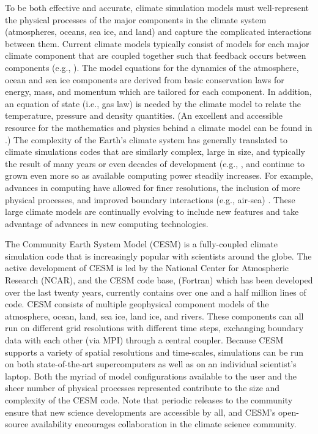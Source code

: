 To be both effective and accurate, climate simulation models must well-represent the physical processes of the major components in the climate system (atmospheres, oceans, sea ice, and land) and capture the complicated interactions between them.  Current climate models typically consist of models for each major climate component that are coupled together such that feedback occurs between components (e.g., \cite{washington2005}).  The model equations for the dynamics of the atmosphere, ocean and sea ice components are derived from basic conservation laws for energy, mass, and momentum which are tailored for each component.  In addition, an equation of state (i.e., gas law) is needed by the climate model to relate the temperature, pressure and density quantities. (An excellent and accessible resource for the mathematics and physics behind a climate model can be found in \cite{washington2005}.)  The complexity of the Earth's climate system has generally translated to climate simulations codes that are similarly complex, large in size, and typically the result of many years or even decades of development (e.g., \cite{easterbrook2011},\cite{pipitone2012} and continue to grown even more so as available computing power steadily increases.  For example, advances in computing have allowed for finer resolutions, the inclusion of more physical processes, and improved boundary interactions (e.g., air-sea) \cite{washington2009}.  These large climate models are continually evolving to include new features and take advantage of advances in new computing technologies.


The Community Earth System Model (CESM) is a fully-coupled climate simulation code \cite{cesm2013} that is increasingly popular with scientists around the globe.  The active development of CESM is led by the National Center for Atmospheric Research (NCAR), and the CESM code base, (Fortran) which has been developed over the last twenty years, currently contains over one and a half million lines of code.  CESM consists of multiple geophysical component models of the atmosphere, ocean, land, sea ice, land ice, and rivers.  These components can all run on different grid resolutions with different time steps, exchanging boundary data with each other (via MPI) through a central coupler.  Because CESM supports a variety of spatial resolutions and time-scales, simulations can be run on both state-of-the-art supercomputers as well as on an individual scientist's laptop.  Both the myriad of model configurations available to the user and the sheer number of physical processes represented contribute to the size and complexity of the CESM code.  Note that periodic releases to the community ensure that new science developments are accessible by all, and CESM's open-source availability encourages collaboration in the climate science community.


